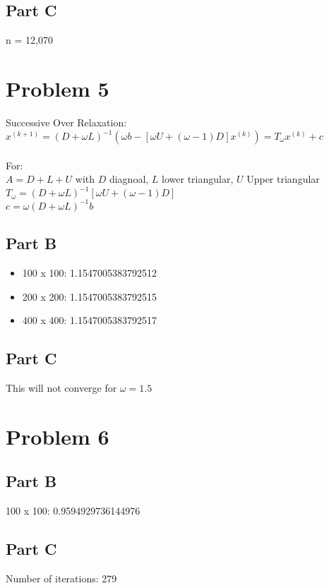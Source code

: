 \documentclass{article}
\begin{document}
\subsection*{Part C}
n = 12,070



\section*{Problem 5}
Successive Over Relaxation: \( x^{(k+1)} = (D + \omega L)^{-1}(\omega b - [\omega U + (\omega-1)D]x^{(k)}) = T_{\omega} x^{(k)} + c \)\\
\\
For:\\
\( A = D + L + U \) with $D$ diagnoal, $L$ lower triangular, $U$ Upper triangular\\
\( T_{\omega} = (D + \omega L)^{-1}[\omega U + (\omega-1)D] \)\\
\( c = \omega (D + \omega L)^{-1} b \)\\

\subsection*{Part B}
\begin{itemize}
    \item 100 x 100: 1.1547005383792512
    \item 200 x 200: 1.1547005383792515
    \item 400 x 400: 1.1547005383792517
\end{itemize}


\subsection*{Part C}
This will not converge for $\omega=1.5$

\section*{Problem 6}

\subsection*{Part B}
    \item 100 x 100: 0.9594929736144976

\subsection*{Part C}
Number of iterations: 279
\end{document}
